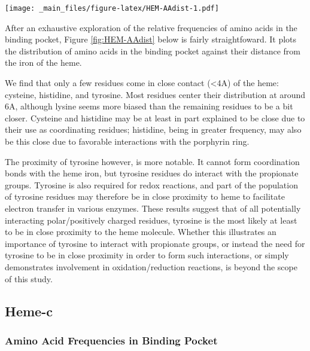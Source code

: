 \documentclass[a4paper, nobind]{templates/ociamthesis}
\let\origfigure\figure
\let\endorigfigure\endfigure
\renewenvironment{figure}[1][2] {
    \expandafter\origfigure\expandafter[H]
} {
    \endorigfigure
}
\begin{document}
\begin{figure}
\centering
\texttt{[image: \_main\_files/figure-latex/HEM-AAdist-1.pdf]}
\caption{\label{fig:HEM-AAdist}HEM: Residue Distribution by Distance}
\end{figure}

After an exhaustive exploration of the relative frequencies of amino acids in the binding pocket, Figure \ref{fig:HEM-AAdist} below is fairly straightfoward. It plots the distribution of amino acids in the binding pocket against their distance from the iron of the heme.

We find that only a few residues come in close contact (\textless4A) of the heme: cysteine, histidine, and tyrosine. Most residues center their distribution at around 6A, although lysine seems more biased than the remaining residues to be a bit closer. Cysteine and histidine may be at least in part explained to be close due to their use as coordinating residues; histidine, being in greater frequency, may also be this close due to favorable interactions with the porphyrin ring.

The proximity of tyrosine however, is more notable. It cannot form coordination bonds with the heme iron, but tyrosine residues do interact with the propionate groups. Tyrosine is also required for redox reactions, and part of the population of tyrosine residues may therefore be in close proximity to heme to facilitate electron transfer in various enzymes\autocite{Poulos2014}. These results suggest that of all potentially interacting polar/positively charged residues, tyrosine is the most likely at least to be in close proximity to the heme molecule. Whether this illustrates an importance of tyrosine to interact with propionate groups, or instead the need for tyrosine to be in close proximity in order to form such interactions, or simply demonstrates involvement in oxidation/reduction reactions, is beyond the scope of this study.

\hypertarget{heme-c-1}{%
\subsection{Heme-c}\label{heme-c-1}}

\hypertarget{amino-acid-frequencies-in-binding-pocket-1}{%
\subsubsection{Amino Acid Frequencies in Binding Pocket}\label{amino-acid-frequencies-in-binding-pocket-1}}
\end{document}
